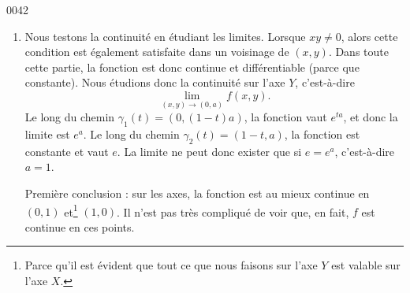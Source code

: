 \begin{corrige}{0042}
\begin{alternative}
\begin{enumerate}
\item\label{Item0042b}
Nous testons la continuité en étudiant les limites. Lorsque $xy\neq 0$, alors cette condition est également satisfaite dans un voisinage de $(x,y)$. Dans toute cette partie, la fonction est donc continue et différentiable (parce que constante). Nous étudions donc la continuité sur l'axe $Y$, c'est-à-dire
\begin{equation}
	\lim_{(x,y)\to(0,a)}f(x,y).
\end{equation}
Le long du chemin $\gamma_1(t)=(0,(1-t)a)$, la fonction vaut $ e^{ta}$, et donc la limite est $e^a$. Le long du chemin $\gamma_2(t)=(1-t,a)$, la fonction est constante et vaut $e$. La limite ne peut donc exister que si $e=e^a$, c'est-à-dire $a=1$.

Première conclusion : sur les axes, la fonction est au mieux continue en $(0,1)$ et\footnote{Parce qu'il est évident que tout ce que nous faisons sur l'axe $Y$ est valable sur l'axe $X$.} $(1,0)$. Il n'est pas très compliqué de voir que, en fait, $f$ est continue en ces points.


\end{enumerate}
\end{alternative}
\end{corrige}
